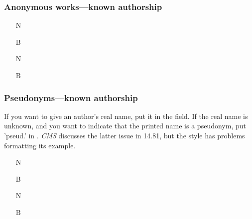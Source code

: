 \documentclass[11pt,letterpaper,oneside]{article}
\begin{document}
\subsubsection{Anonymous works---known authorship}
\label{14.80}

\begin{itemize}
\item[N] 

\item[B] 

\item[N] 

\item[B] 
\end{itemize}





\setcounter{subsubsection}{81}
\subsubsection{Pseudonyms---known authorship}
\label{14.82}

If you want to give an author's real name, put it in the
 field. If the real name is unknown, and you want
to indicate that the printed name is a pseudonym, put 'pseud.' in
. \textit{CMS} discusses the latter issue in
14.81, but the style has problems formatting its example.

\begin{itemize}
\item[N] 

\item[B] 

\item[N] 

\item[B] 
\end{itemize}
\end{document}
